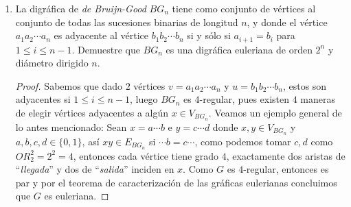 \documentclass{article}
\begin{document}
\begin{enumerate}
\begin{proof}
\begin{itemize}
      Como todos los vértices son consecutivos, notemos que cada vértice de $C$ es cola y cabeza para dos flechas distintas en el circuito $\rightarrow$ para todo $V_k$ que pertenece a $C$ existe $d^+$ y $d^-$ que une a $V_k$ con sus vértices adyacentes $V_{k-1}$ y $V_{k+1}$.

      Así, cada vértice de la trayectoria $C$ tendrá  una ``arista" $d^+$ y una $d^-$ (ya que $D$ es par y por construcción de $C$).

      Por lo tanto, $d^+ = d^-$ ya que para todo vértice de $D$ se pueden sumar el número de veces que aparecen en la trayectoria $C$ y preservará la igualdad anterior.

    \item $\Longleftarrow$.

      Sea $D$ conexa y para toda $v$ que pertenece a $V_D$ se tiene que $d^+ = d^- \rightarrow$ para toda $v$ que pertenece a $V_D$, existe al menos una $d^+$ y una $d^-$.

      Por lo que para todo $v$ que pertenece a $V_D$, $v$ es mayor igual a $2$. Pero el grado de $v$ siempre debe ser par, ya que tenemos la igualdad $d^+ = d^- \rightarrow$ $D$ es par.

      Por lo tanto, por teorema visto en clase tenemos que $D$ es una gráfica eucliriana.
    \end{itemize}
  \end{proof}
\item La digr\'afica de {\em de Bruijn-Good} $BG_n$ tiene como
  conjunto de v\'ertices al conjunto de todas las sucesiones
  binarias de longitud $n$, y donde el v\'ertice $a_1 a_2
  \cdots a_n$ es adyacente al v\'ertice $b_1 b_2 \cdots b_n$
  si y s\'olo si $a_{i+1} = b_i$ para $1 \le i \le n-1$.  Demuestre
  que $BG_n$ es una digr\'afica euleriana de orden $2^n$ y
  di\'ametro dirigido $n$.
  
  \begin{proof}
    Sabemos que dado $2$ vértices $v = a_1a_2 \dotsm a_n$ y
    $u = b_1b_2 \dotsm b_n$, estos son adyacentes si $1 \leq i \leq n -1$,
    luego $BG_n$ es $4$-regular, pues existen $4$ maneras de elegir
    vértices adyacentes a algún $x \in V_{BG_n}$. Veamos un ejemplo
    general de lo antes mencionado: Sean $x = a \dotsm b$ e $y = c \dotsm d$
    donde $x, y \in V_{BG_n}$ y $a,b,c,d \in \{0,1\}$, así $xy \in E_{BG_n}$
    si $\dotsm b = c \dotsm$, como podemos tomar $c,d$ como $OR_2^2 = 2^2 = 4$,
    entonces cada vértice tiene grado $4$, exactamente dos aristas de
    ``\textit{llegada}'' y dos de ``\textit{salida}'' inciden en $x$.
    Como $G$ es $4$-regular, entonces es par y por el teorema de caracterización
    de las gráficas eulerianas concluimos que $G$ es euleriana.


\end{proof}
\end{enumerate}
\end{document}
